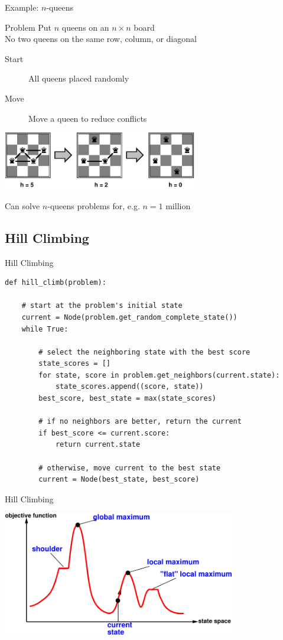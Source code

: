 \documentclass[14pt]{beamer}
\begin{document}
\begin{frame}{Example: $n$-queens}
\begin{block}{Problem}
Put $n$ queens on an $n \times n$ board \\
No two queens on the same row, column, or diagonal
\end{block}
\begin{description}
\item[Start] All queens placed randomly
\item[Move] Move a queen to reduce conflicts
\end{description}
\begin{center}
\includegraphics[height=1in]{4-queens-iterative.pdf}
\end{center}
Can solve $n$-queens problems for, e.g. $n = 1$ million
\end{frame}


\subsection{Hill Climbing}


\begin{frame}[fragile]{Hill Climbing}
\scriptsize
\begin{lstlisting}
def hill_climb(problem):

    # start at the problem's initial state
    current = Node(problem.get_random_complete_state())
    while True:

        # select the neighboring state with the best score
        state_scores = []
        for state, score in problem.get_neighbors(current.state):
            state_scores.append((score, state))
        best_score, best_state = max(state_scores)

        # if no neighbors are better, return the current
        if best_score <= current.score:
            return current.state

        # otherwise, move current to the best state
        current = Node(best_state, best_score)
\end{lstlisting}
\end{frame}


\begin{frame}{Hill Climbing}
\begin{center}
\includegraphics[width=4in]{hill-climbing.pdf}
\end{center}
\end{frame}
\end{document}
